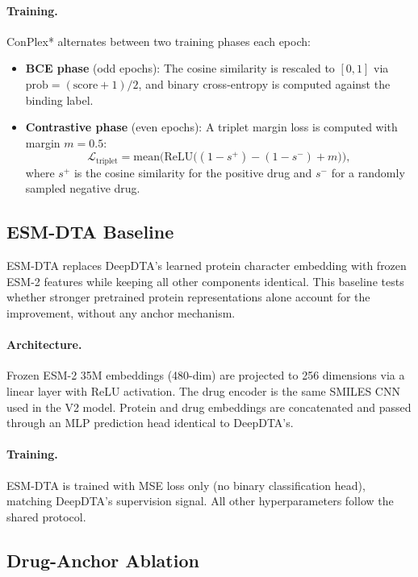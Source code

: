 \documentclass[11pt]{article}
\begin{document}
\paragraph{Training.}
ConPlex* alternates between two training phases each epoch:
\begin{itemize}
    \item \textbf{BCE phase} (odd epochs): The cosine similarity is rescaled to $[0, 1]$ via $\mathrm{prob} = (\mathrm{score} + 1)/2$, and binary cross-entropy is computed against the binding label.
    \item \textbf{Contrastive phase} (even epochs): A triplet margin loss is computed with margin $m = 0.5$:
    \[
    \mathcal{L}_{\mathrm{triplet}} = \mathrm{mean}\!\Big(\mathrm{ReLU}\!\big((1 - s^+) - (1 - s^-) + m\big)\Big),
    \]
    where $s^+$ is the cosine similarity for the positive drug and $s^-$ for a randomly sampled negative drug.
\end{itemize}

\subsection{ESM-DTA Baseline}

ESM-DTA replaces DeepDTA's learned protein character embedding with frozen ESM-2 features while keeping all other components identical. This baseline tests whether stronger pretrained protein representations alone account for the improvement, without any anchor mechanism.

\paragraph{Architecture.}
Frozen ESM-2 35M embeddings (480-dim) are projected to 256 dimensions via a linear layer with ReLU activation. The drug encoder is the same SMILES CNN used in the V2 model. Protein and drug embeddings are concatenated and passed through an MLP prediction head identical to DeepDTA's.

\paragraph{Training.}
ESM-DTA is trained with MSE loss only (no binary classification head), matching DeepDTA's supervision signal. All other hyperparameters follow the shared protocol.

\subsection{Drug-Anchor Ablation}
\end{document}
